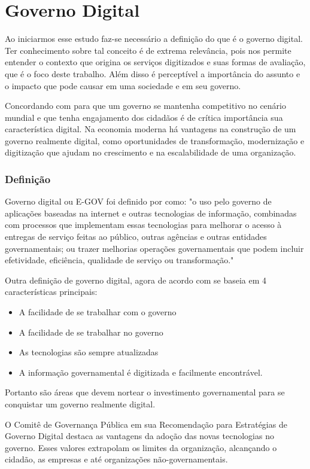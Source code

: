 \chapter[Governo Digital]{Governo Digital}
Ao iniciarmos esse estudo faz-se necessário a definição do que é o governo digital. Ter conhecimento sobre tal conceito é de extrema relevância, pois nos permite entender o contexto que origina os serviços digitizados e suas formas de avaliação, que é o foco deste trabalho. Além disso é perceptível a importância do assunto e o impacto que pode causar em uma sociedade e em seu governo.

Concordando com \cite{itac2016} para que um governo se mantenha competitivo no cenário mundial e que tenha engajamento dos cidadãos é de crítica importância sua característica digital. Na economia moderna há vantagens na construção de um governo realmente digital, como oportunidades de transformação, modernização e digitização que ajudam no crescimento e na escalabilidade de uma organização.

\subsection{Definição}
Governo digital ou E-GOV foi definido por \cite[p.~2902]{act2002} como: "o uso pelo governo de aplicações baseadas na internet e outras tecnologias de informação, combinadas com processos que implementam essas tecnologias para melhorar o acesso à entregas de serviço feitas ao público, outras agências e outras entidades governamentais; ou trazer melhorias operações governamentais que podem incluir efetividade, eficiência, qualidade de serviço ou transformação."

Outra definição de governo digital, agora de acordo com \cite{itac2016} se baseia em 4 características principais:
\begin{itemize}
	\item A facilidade de se trabalhar com o governo
	\item A facilidade de se trabalhar no governo
	\item As tecnologias são sempre atualizadas 
	\item A informação governamental é digitizada e facilmente encontrável.
\end{itemize}

Portanto são áreas que devem nortear o investimento governamental para se conquistar um governo realmente digital.
 
O Comitê de Governança Pública em sua Recomendação para Estratégias de Governo Digital \cite{oecd2014} destaca as vantagens da adoção das novas tecnologias no governo. Esses valores extrapolam os limites da organização, alcançando o cidadão, as empresas e até organizações não-governamentais. 

